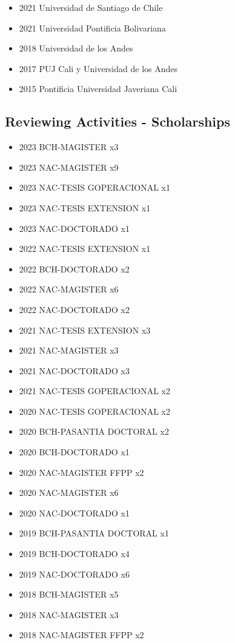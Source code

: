 {\begin{itemize}
\item 2021 Universidad de Santiago de Chile
\end{itemize}
}

{\begin{itemize}
\item 2021 Universidad Pontificia Bolivariana
\item 2018 Universidad de los Andes
\item 2017 PUJ Cali y Universidad de los Andes
\item 2015 Pontificia Universidad Javeriana Cali
\end{itemize}
}
\clearpage

\subsection{Reviewing Activities - Scholarships}

{\begin{itemize}
\item 2023 BCH-MAGISTER x3
\item 2023 NAC-MAGISTER x9
\item 2023 NAC-TESIS GOPERACIONAL x1
\item 2023 NAC-TESIS EXTENSION x1
\item 2023 NAC-DOCTORADO x1
\item 2022 NAC-TESIS EXTENSION x1
\item 2022 BCH-DOCTORADO x2
\item 2022 NAC-MAGISTER x6
\item 2022 NAC-DOCTORADO x2
\item 2021 NAC-TESIS EXTENSION x3
\item 2021 NAC-MAGISTER x3
\item 2021 NAC-DOCTORADO x3
\item 2021 NAC-TESIS GOPERACIONAL x2
\item 2020 NAC-TESIS GOPERACIONAL x2
\item 2020 BCH-PASANTIA DOCTORAL x2
\item 2020 BCH-DOCTORADO x1
\item 2020 NAC-MAGISTER FFPP x2
\item 2020 NAC-MAGISTER x6
\item 2020 NAC-DOCTORADO x1
\item 2019 BCH-PASANTIA DOCTORAL x1
\item 2019 BCH-DOCTORADO x4
\item 2019 NAC-DOCTORADO x6
\item 2018 BCH-MAGISTER x5
\item 2018 NAC-MAGISTER x3
\item 2018 NAC-MAGISTER FFPP x2
\end{itemize}
}


